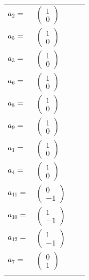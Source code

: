 \documentclass[1p]{elsarticle_modified}
\theoremstyle{definition}
\begin{document}
\begin{tabular}{m{7pt} m{180pt} m{7pt} m{180pt} }
\flushright $a_{2}=$&$\begin{pmatrix}1\\0\end{pmatrix}$ \\
\flushright $a_{5}=$&$\begin{pmatrix}1\\0\end{pmatrix}$ \\
\flushright $a_{3}=$&$\begin{pmatrix}1\\0\end{pmatrix}$ \\
\flushright $a_{6}=$&$\begin{pmatrix}1\\0\end{pmatrix}$ \\
\flushright $a_{8}=$&$\begin{pmatrix}1\\0\end{pmatrix}$ \\
\flushright $a_{9}=$&$\begin{pmatrix}1\\0\end{pmatrix}$ \\
\flushright $a_{1}=$&$\begin{pmatrix}1\\0\end{pmatrix}$ \\
\flushright $a_{4}=$&$\begin{pmatrix}1\\0\end{pmatrix}$ \\
\flushright $a_{11}=$&$\begin{pmatrix}0\\-1\end{pmatrix}$ \\
\flushright $a_{10}=$&$\begin{pmatrix}1\\-1\end{pmatrix}$ \\
\flushright $a_{12}=$&$\begin{pmatrix}1\\-1\end{pmatrix}$ \\
\flushright $a_{7}=$&$\begin{pmatrix}0\\1\end{pmatrix}$\\&\end{tabular}
\end{document}
